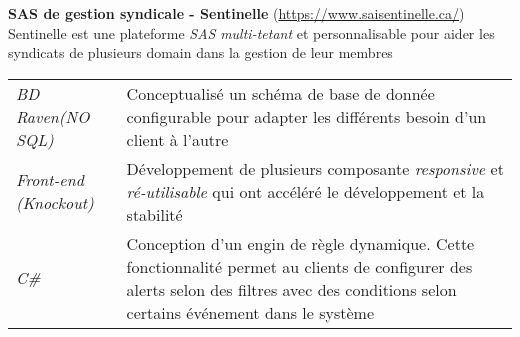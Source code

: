 \documentclass[a4paper,9pt]{extarticle}
\begin{document}
\textbf{SAS de gestion syndicale - Sentinelle} (\href{https://www.saisentinelle.ca/}{https://www.saisentinelle.ca/}) \newline{}
\small{ Sentinelle est une plateforme \textit{SAS} \textit{multi-tetant} et personnalisable pour aider les syndicats de plusieurs domain dans la gestion de leur membres} \vspace{1em}\newline{} 
\begin{tabular*}{\linewidth}{p{ }
		p{ }} 
	\fontsize{8}{9}\textit{BD Raven(NO SQL)} & \small{Conceptualisé un schéma de base de donnée configurable pour adapter les différents besoin d'un client à l'autre} \vspace{0.3em}\\
	\fontsize{8}{9}\textit{Front-end (Knockout)} & \small{Développement de plusieurs composante \textit{responsive} et \textit{ré-utilisable} qui ont accéléré le développement et la stabilité} \vspace{0.3em}\\
	\fontsize{8}{9}\textit{C\#} & \small{Conception d'un engin de règle dynamique. Cette fonctionnalité permet au clients de configurer des alerts selon des filtres avec des conditions selon certains événement dans le système}
	
\end{tabular*}
\end{document}
